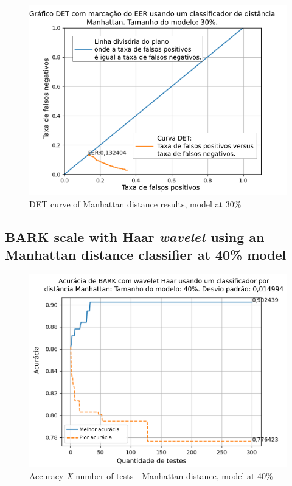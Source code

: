 \begin{figure}[!ht]
	\centering
	\includegraphics[width=\linewidth]{images/results/det/DET_for_classifier_Manhattan_30}
	\caption{DET curve of Manhattan distance results, model at 30\%}
	\label{fig:detforclassifiermanhattan30}
\end{figure}

\subsection{BARK scale with Haar \textit{wavelet} using an Manhattan distance classifier at 40\% model}



\begin{figure}[!ht]
	\centering
	\includegraphics[width=\linewidth]{images/results/confusionMatrices/classifier_Manhattan_40.png}
	\caption{Accuracy \textit{X} number of tests - Manhattan distance, model at 40\%}
	\label{fig:classifiermanhattan40}
\end{figure}


